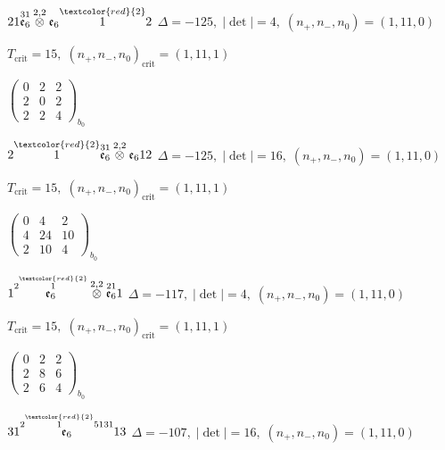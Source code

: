 \documentclass[10pt]{article}
\begin{document}
\smallskip

$21\overset{31}{\mathfrak{e}_6}\overset{2,2}{\otimes}\mathfrak{e}_6\overset{\textcolor{red}{2}}{1}2$ \quad $\Delta=-125,\; |\det|=4,\; (n_+,n_-,n_0)=(1,11,0)$

\hspace{1em}$T_{\text{crit}}=15,\; (n_+,n_-,n_0)_{\text{crit}}=(1,11,1)$

\hspace{2em}$\left(\begin{smallmatrix}0 & 2 & 2 \\ 2 & 0 & 2 \\ 2 & 2 & 4\end{smallmatrix}\right)_{\!b_0}$

$2\overset{\textcolor{red}{2}}{1}\overset{31}{\mathfrak{e}_6}\overset{2,2}{\otimes}\mathfrak{e}_612$ \quad $\Delta=-125,\; |\det|=16,\; (n_+,n_-,n_0)=(1,11,0)$

\hspace{1em}$T_{\text{crit}}=15,\; (n_+,n_-,n_0)_{\text{crit}}=(1,11,1)$

\hspace{2em}$\left(\begin{smallmatrix}0 & 4 & 2 \\ 4 & 24 & 10 \\ 2 & 10 & 4\end{smallmatrix}\right)_{\!b_0}$

\smallskip

$1\overset{2\overset{\textcolor{red}{2}}{1}}{\mathfrak{e}_6}\overset{2,2}{\otimes}\overset{21}{\mathfrak{e}_6}1$ \quad $\Delta=-117,\; |\det|=4,\; (n_+,n_-,n_0)=(1,11,0)$

\hspace{1em}$T_{\text{crit}}=15,\; (n_+,n_-,n_0)_{\text{crit}}=(1,11,1)$

\hspace{2em}$\left(\begin{smallmatrix}0 & 2 & 2 \\ 2 & 8 & 6 \\ 2 & 6 & 4\end{smallmatrix}\right)_{\!b_0}$

\smallskip

$31\overset{2\overset{\textcolor{red}{2}}{1}5131}{\mathfrak{e}_6}13$ \quad $\Delta=-107,\; |\det|=16,\; (n_+,n_-,n_0)=(1,11,0)$
\end{document}
